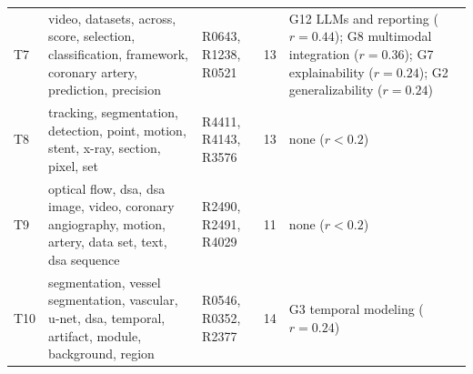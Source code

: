 \begin{longtable}{>{\raggedright\arraybackslash}p{0.7cm} >{\raggedright\arraybackslash}p{6.2cm} >{\raggedright\arraybackslash}p{2.9cm} r >{\raggedright\arraybackslash}p{4.2cm}}
T7 & video, datasets, across, score, selection, classification, framework, coronary artery, prediction, precision & R0643, R1238, R0521 & 13 & G12 LLMs and reporting ($r=0.44$); G8 multimodal integration ($r=0.36$); G7 explainability ($r=0.24$); G2 generalizability ($r=0.24$)\\
T8 & tracking, segmentation, detection, point, motion, stent, x-ray, section, pixel, set & R4411, R4143, R3576 & 13 & none ($r<0.2$)\\
T9 & optical flow, dsa, dsa image, video, coronary angiography, motion, artery, data set, text, dsa sequence & R2490, R2491, R4029 & 11 & none ($r<0.2$)\\
T10 & segmentation, vessel segmentation, vascular, u-net, dsa, temporal, artifact, module, background, region & R0546, R0352, R2377 & 14 & G3 temporal modeling ($r=0.24$)\\
\end{longtable}
